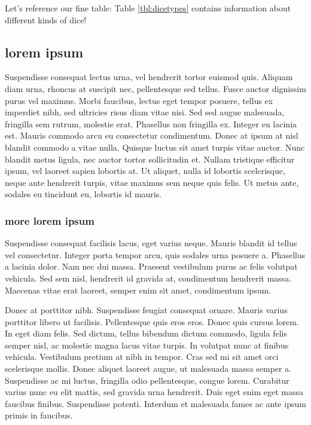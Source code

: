 \documentclass[english]{jamk-report}
\begin{document}
Let's reference our fine table: Table \ref{tbl:dicetypes} contains information
about different kinds of dice!~\cite{einstein}


\subsection{lorem ipsum}

Suspendisse consequat lectus urna, vel hendrerit tortor euismod quis. Aliquam
diam urna, rhoncus at suscipit nec, pellentesque sed tellus. Fusce auctor
dignissim purus vel maximus. Morbi faucibus, lectus eget tempor posuere, tellus
ex imperdiet nibh, sed ultricies risus diam vitae nisi. Sed sed augue
malesuada, fringilla sem rutrum, molestie erat.  Phasellus non fringilla ex.
Integer eu lacinia est. Mauris commodo arcu eu consectetur condimentum. Donec
at ipsum at nisl blandit commodo a vitae nulla.  Quisque luctus sit amet turpis
vitae auctor. Nunc blandit metus ligula, nec auctor tortor sollicitudin et.
Nullam tristique efficitur ipsum, vel laoreet sapien lobortis at. Ut aliquet,
nulla id lobortis scelerisque, neque ante hendrerit turpis, vitae maximus sem
neque quis felis. Ut metus ante, sodales eu tincidunt eu, lobortis id mauris.

\subsubsection{more lorem ipsum}

Suspendisse consequat facilisis lacus, eget varius neque. Mauris blandit id
tellus vel consectetur. Integer porta tempor arcu, quis sodales urna posuere a.
Phasellus a lacinia dolor. Nam nec dui massa. Praesent vestibulum purus ac
felis volutpat vehicula. Sed sem nisl, hendrerit id gravida at, condimentum
hendrerit massa.  Maecenas vitae erat laoreet, semper enim sit amet,
condimentum ipsum.~\cite{Puuska_2019,Haar_1910}

Donec at porttitor nibh. Suspendisse feugiat consequat ornare.  Mauris varius
porttitor libero ut facilisis. Pellentesque quis eros eros. Donec quis cursus
lorem. In eget diam felis. Sed dictum, tellus bibendum dictum commodo, ligula
felis semper nisl, ac molestie magna lacus vitae turpis. In volutpat nunc at
finibus vehicula. Vestibulum pretium at nibh in tempor. Cras sed mi sit amet
orci scelerisque mollis. Donec aliquet laoreet augue, ut malesuada massa semper
a. Suspendisse ac mi luctus, fringilla odio pellentesque, congue lorem.
Curabitur varius nunc eu elit mattis, sed gravida urna hendrerit. Duis eget
enim eget massa faucibus finibus. Suspendisse potenti. Interdum et malesuada
fames ac ante ipsum primis in faucibus.
\end{document}
